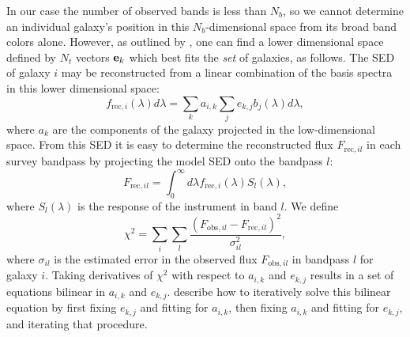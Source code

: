 \documentclass[10pt,preprint]{aastex}
\newcommand{\vv}[1]{{\bf #1}}
\begin{document}
In our case the number of observed bands is less than $N_b$, so we
cannot determine an individual galaxy's position in this
$N_b$-dimensional space from its broad band colors alone.  However, as
outlined by \citet{csabai00a}, one can find a lower dimensional space
defined by $N_t$ vectors $\vv{e}_k$ which best fits the {\it set} of
galaxies, as follows. The SED of galaxy $i$ may be reconstructed from a
linear combination of the basis spectra in this lower dimensional
space:
\begin{equation}
\label{lincomb}
f_{\mathrm{rec},i}(\lambda) d\lambda = 
\sum_k a_{i,k} \sum_j e_{k,j} b_j(\lambda) d\lambda,
\end{equation}
where $a_k$ are the components of the galaxy projected in the
low-dimensional space. From this SED it is easy to determine the
reconstructed flux
$F_{\mathrm{rec},il}$ in each survey bandpass by projecting
the model SED onto the bandpass $l$: 
\begin{equation}
F_{\mathrm{rec},il} = \int_0^\infty d\lambda
f_{\mathrm{rec},i}(\lambda) S_l(\lambda),
\end{equation}
where $S_l(\lambda)$ is the response of the instrument in band $l$.  We define
\begin{equation}
\chi^2 = \sum_i \sum_l
\frac{(F_{\mathrm{obs},il}-F_{\mathrm{rec},il})^2}{\sigma_{il}^2},
\end{equation}
where $\sigma_{il}$ is the estimated error in the observed flux
$F_{\mathrm{obs},il}$ in bandpass $l$ for galaxy $i$. Taking
derivatives of $\chi^2$ with respect to $a_{i,k}$ and $e_{k,j}$
results in a set of equations bilinear in $a_{i,k}$ and $e_{k,j}$.
\citet{csabai00a} describe how to iteratively solve this bilinear
equation by first fixing $e_{k,j}$ and fitting for $a_{i,k}$, then
fixing $a_{i,k}$ and fitting for $e_{k,j}$, and iterating that
procedure.

\end{document}
